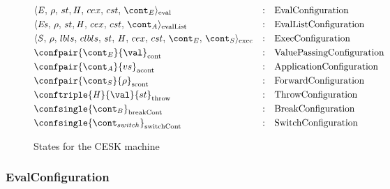 \documentclass{article}
\begin{document}
\newcommand{\breakconf}[1]{\confsingle{#1}_{\mathrm{breakCont}}}
\newcommand{\switchconf}[1]{\confsingle{#1}_{\mathrm{switchCont}}}
\newcommand{\contconf}[2]{\confpair{#1}{#2}_{\mathrm{cont}}}
\newcommand{\scontconf}[2]{\confpair{#1}{#2}_{\mathrm{scont}}}
\newcommand{\acontconf}[2]{\confpair{#1}{#2}_{\mathrm{acont}}}
\newcommand{\throwconf}[3]{\conftriple{#1}{#2}{#3}_{\mathrm{throw}}}
\newcommand{\evallistconf}[6]{\langle{#1},\,{#2},\,{#3},\handler,\,{#4},\,{#5},\,{#6}\rangle_{\mathrm{evalList}}}
\newcommand{\evalconf}[6]{\langle{#1},\,{#2},\,{#3},\handler,\,{#4},\,{#5},\,{#6}\rangle_{\mathrm{eval}}}
\newcommand{\execconf}[9]{\langle{#1},\,{#2},\,{#3},\,{#4},\,\strace,\,{#5},\,{#6},\,{#7},\,{#8},\,{#9}\rangle_{\mathrm{exec}}}

\begin{figure}[Htp]
  \begin{align}
	&\evalconf{\expr}{\env}{st}{cex}{cst}{\econt} & :\quad & \text{EvalConfiguration} \label{config:eval}\\
	&\evallistconf{\exprs}{\env}{st}{cex}{cst}{\acont} & :\quad & \text{EvalListConfiguration} \label{config:evallist}\\
	&\execconf{\stmt}{\env}{\lbls}{\clbls}{\handler}{\cex}{\cstrace}{\econt}{\scont}  & :\quad & \text{ExecConfiguration} \label{config:exec}\\
	&\contconf{\econt}{\val} & :\quad & \text{ValuePassingConfiguration} \label{config:econt}\\
	&\acontconf{\acont}{\vals} & :\quad & \text{ApplicationConfiguration} \label{config:acont}\\
	&\scontconf{\scont}{\env} & :\quad & \text{ForwardConfiguration} \label{config:scont}\\
	&\throwconf{\handler}{\val}{\strace} & :\quad & \text{ThrowConfiguration} \label{config:throw}\\
	&\breakconf{\bcont} & :\quad & \text{BreakConfiguration} \label{config:bcont}\\
	&\switchconf{\switchcont} & :\quad &
	\text{SwitchConfiguration}
	\label{config:switchcont}
  \end{align}
  \caption{States for the CESK machine}
\end{figure}

\subsubsection{EvalConfiguration}
\label{subsubsec:evalconfig}
\end{document}
